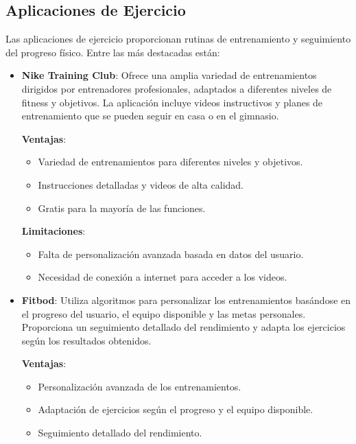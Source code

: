 \subsection{Aplicaciones de Ejercicio}

Las aplicaciones de ejercicio proporcionan rutinas de entrenamiento y seguimiento del progreso físico. Entre las más destacadas están:

\begin{itemize}
  \item \textbf{Nike Training Club}: Ofrece una amplia variedad de entrenamientos dirigidos por entrenadores profesionales, adaptados a diferentes niveles de fitness y objetivos. La aplicación incluye videos instructivos y planes de entrenamiento que se pueden seguir en casa o en el gimnasio.

    \textbf{Ventajas}:
    \begin{itemize}
      \item Variedad de entrenamientos para diferentes niveles y objetivos.
      \item Instrucciones detalladas y videos de alta calidad.
      \item Gratis para la mayoría de las funciones.
    \end{itemize}

    \textbf{Limitaciones}:
    \begin{itemize}
      \item Falta de personalización avanzada basada en datos del usuario.
      \item Necesidad de conexión a internet para acceder a los videos.
    \end{itemize}
  
  \item \textbf{Fitbod}: Utiliza algoritmos para personalizar los entrenamientos basándose en el progreso del usuario, el equipo disponible y las metas personales. Proporciona un seguimiento detallado del rendimiento y adapta los ejercicios según los resultados obtenidos.

    \textbf{Ventajas}:
    \begin{itemize}
      \item Personalización avanzada de los entrenamientos.
      \item Adaptación de ejercicios según el progreso y el equipo disponible.
      \item Seguimiento detallado del rendimiento.
    \end{itemize}


\end{itemize}

